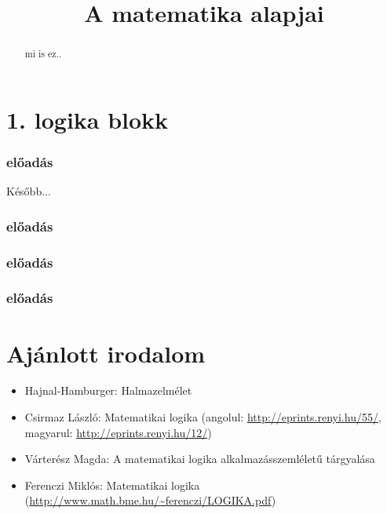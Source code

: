 \documentclass[a4paper]{amsart}
\begin{document}
\title{A matematika alapjai}
\begin{abstract}
mi is ez..
\end{abstract}
\maketitle
\part*{1. logika blokk}
\section{előadás}
Később...
\section{előadás}

\section{előadás}

\section{előadás}

\part*{Ajánlott irodalom}
\begin{itemize}
\item Hajnal-Hamburger: Halmazelmélet
\item Csirmaz László: Matematikai logika (angolul: \url{http://eprints.renyi.hu/55/},\\ magyarul: \url{http://eprints.renyi.hu/12/})
\item Várterész Magda: A matematikai logika alkalmazásszemléletű tárgyalása
\item Ferenczi Miklós: Matematikai logika (\url{http://www.math.bme.hu/~ferenczi/LOGIKA.pdf})
\end{itemize}
\end{document}
